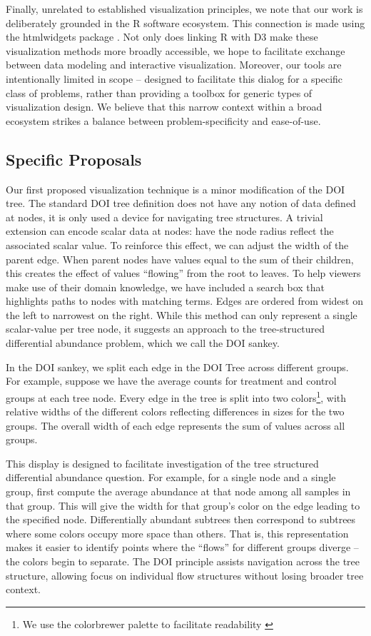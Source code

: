\documentclass[12pt]{article}
\begin{document}
Finally, unrelated to established visualization principles, we note that our
work is deliberately grounded in the R software ecosystem. This connection is
made using the htmlwidgets package \citep{vaidyanathan2014htmlwidgets}. Not only
does linking R with D3 make these visualization methods more broadly accessible,
we hope to facilitate exchange between data modeling and interactive
visualization. Moreover, our tools are intentionally limited in scope --
designed to facilitate this dialog for a specific class of problems, rather than
providing a toolbox for generic types of visualization design. We believe that
this narrow context within a broad ecosystem strikes a balance between
problem-specificity and ease-of-use.

\subsection{Specific Proposals}\label{specific-proposals}

Our first proposed visualization technique is a minor modification of the DOI
tree. The standard DOI tree definition does not have any notion of data defined
at nodes, it is only used a device for navigating tree structures. A trivial
extension can encode scalar data at nodes: have the node radius reflect the
associated scalar value. To reinforce this effect, we can adjust the width of
the parent edge. When parent nodes have values equal to the sum of their
children, this creates the effect of values ``flowing'' from the root to leaves.
To help viewers make use of their domain knowledge, we have included a search
box that highlights paths to nodes with matching terms. Edges are ordered from
widest on the left to narrowest on the right. While this method can only
represent a single scalar-value per tree node, it suggests an approach to the
tree-structured differential abundance problem, which we call the DOI sankey.

In the DOI sankey, we split each edge in the DOI Tree across different groups.
For example, suppose we have the average counts for treatment and control groups
at each tree node. Every edge in the tree is split into two colors\footnote{We
  use the colorbrewer palette to facilitate readability
  \citep{brewer2003colorbrewer}}, with relative widths of the different colors
reflecting differences in sizes for the two groups. The overall width of each
edge represents the sum of values across all groups.

This display is designed to facilitate investigation of the tree structured
differential abundance question. For example, for a single node and a single
group, first compute the average abundance at that node among all samples in
that group. This will give the width for that group's color on the edge leading
to the specified node. Differentially abundant subtrees then correspond to
subtrees where some colors occupy more space than others. That is, this
representation makes it easier to identify points where the ``flows'' for
different groups diverge -- the colors begin to separate. The DOI principle
assists navigation across the tree structure, allowing focus on individual flow
structures without losing broader tree context.
\end{document}
